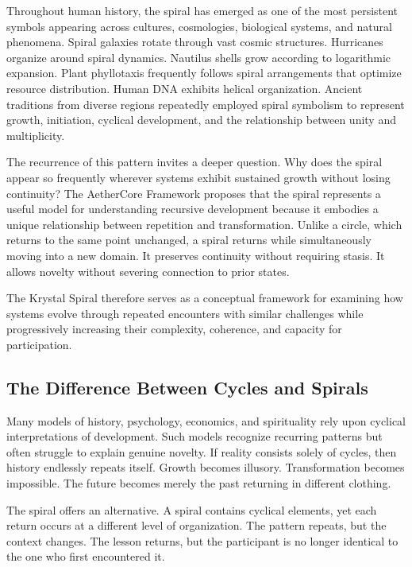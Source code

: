\documentclass[12pt]{article}
\begin{document}
Throughout human history, the spiral has emerged as one of the most persistent symbols appearing across cultures, cosmologies, biological systems, and natural phenomena. Spiral galaxies rotate through vast cosmic structures. Hurricanes organize around spiral dynamics. Nautilus shells grow according to logarithmic expansion. Plant phyllotaxis frequently follows spiral arrangements that optimize resource distribution. Human DNA exhibits helical organization. Ancient traditions from diverse regions repeatedly employed spiral symbolism to represent growth, initiation, cyclical development, and the relationship between unity and multiplicity.

The recurrence of this pattern invites a deeper question. Why does the spiral appear so frequently wherever systems exhibit sustained growth without losing continuity? The AetherCore Framework proposes that the spiral represents a useful model for understanding recursive development because it embodies a unique relationship between repetition and transformation. Unlike a circle, which returns to the same point unchanged, a spiral returns while simultaneously moving into a new domain. It preserves continuity without requiring stasis. It allows novelty without severing connection to prior states.

The Krystal Spiral therefore serves as a conceptual framework for examining how systems evolve through repeated encounters with similar challenges while progressively increasing their complexity, coherence, and capacity for participation.


\subsection{The Difference Between Cycles and Spirals}

Many models of history, psychology, economics, and spirituality rely upon cyclical interpretations of development. Such models recognize recurring patterns but often struggle to explain genuine novelty. If reality consists solely of cycles, then history endlessly repeats itself. Growth becomes illusory. Transformation becomes impossible. The future becomes merely the past returning in different clothing.

The spiral offers an alternative. A spiral contains cyclical elements, yet each return occurs at a different level of organization. The pattern repeats, but the context changes. The lesson returns, but the participant is no longer identical to the one who first encountered it.
\end{document}
